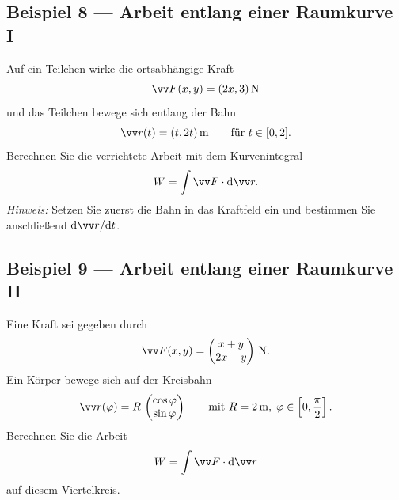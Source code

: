 \documentclass[11pt, a4paper]{article}
\begin{document}
\subsection*{Beispiel 8 — Arbeit entlang einer Raumkurve I}

Auf ein Teilchen wirke die ortsabhängige Kraft
\[
    \ivec{F}(x,y) = \inlrowTwo{2x}{3}\,\si{\newton}
\]
und das Teilchen bewege sich entlang der Bahn
\[
    \ivec{r}(t) = \inlrowTwo{t}{2t}\,\si{\meter}
    \qquad \text{für } t \in [0,2].
\]
Berechnen Sie die verrichtete Arbeit mit dem Kurvenintegral
\[
    W = \int \ivec{F}\cdot \dd \ivec{r}.
\]
\textit{Hinweis:} Setzen Sie zuerst die Bahn in das Kraftfeld ein und bestimmen Sie anschließend $\dd \ivec{r}/\dd t$.

\subsection*{Beispiel 9 — Arbeit entlang einer Raumkurve II}

Eine Kraft sei gegeben durch
\[
    \ivec{F}(x,y) = \icolTwo{x+y}{2x-y}\,\si{\newton}.
\]
Ein Körper bewege sich auf der Kreisbahn
\[
    \ivec{r}(\varphi) = R\,\icolTwo{\cos\varphi}{\sin\varphi}
    \qquad \text{mit } R = \SI{2}{\meter},\; \varphi \in \left[0,\frac{\pi}{2}\right].
\]
Berechnen Sie die Arbeit
\[
    W = \int \ivec{F}\cdot \dd \ivec{r}
\]
auf diesem Viertelkreis.
\end{document}
